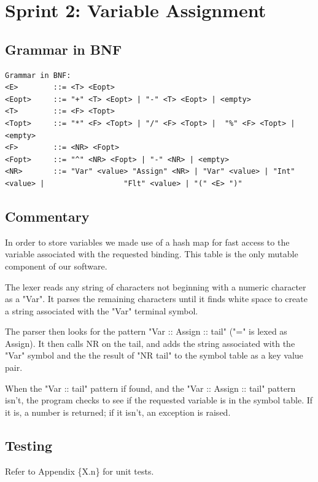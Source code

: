 \documentclass[a4paper, oneside, 11pt]{report}
\begin{document}
    \section{Sprint 2: Variable Assignment}
    \subsection{Grammar in BNF}
    \begin{verbatim}
Grammar in BNF:
<E>        ::= <T> <Eopt>
<Eopt>     ::= "+" <T> <Eopt> | "-" <T> <Eopt> | <empty>
<T>        ::= <F> <Topt>
<Topt>     ::= "*" <F> <Topt> | "/" <F> <Topt> |  "%" <F> <Topt> |<empty>
<F>        ::= <NR> <Fopt>
<Fopt>     ::= "^" <NR> <Fopt> | "-" <NR> | <empty>
<NR>       ::= "Var" <value> "Assign" <NR> | "Var" <value> | "Int" <value> |                  "Flt" <value> | "(" <E> ")"

    \end{verbatim}

    \subsection{Commentary}
    In order to store variables we made use of a hash map for fast access to the variable associated with the requested binding. This table is the only mutable component of our software.

    The lexer reads any string of characters not beginning with a numeric character as a "Var". It parses the remaining characters until it finds white space to create a string associated with the "Var" terminal symbol.

    The parser then looks for the pattern "Var :: Assign :: tail" ("=" is lexed as Assign). It then calls NR on the tail, and adds the string associated with the "Var" symbol and the the result of "NR tail" to the symbol table as a key value pair.

    When the "Var :: tail" pattern if found, and the "Var :: Assign :: tail" pattern isn't, the program checks to see if the requested variable is in the symbol table. If it is, a number is returned; if it isn't, an exception is raised.

    \subsection{Testing}
    Refer to Appendix \{X.n\} for unit tests.

    \clearpage
\end{document}
